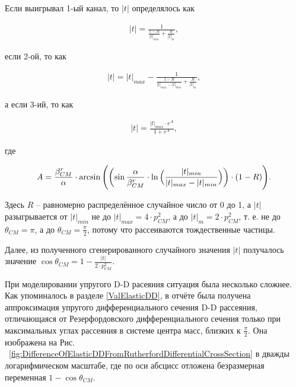 \documentclass[a4paper,12pt]{article}
\begin{document}
\begin{large}
	Если выигрывал 1-ый канал, то $|t|$ определялось как
	
\begin{equation}
\label{Channel1TEqualParticles}
\begin{aligned} 
  |t| = \frac{1}{ \frac{1-R}{|t|_{min}} + \frac{R}{|t|_m} },
\end{aligned}
\end{equation}

	если 2-ой, то как
	
\begin{equation}
\label{Channel2TEqualParticles}
\begin{aligned} 
  |t| = |t|_{max} - \frac{1}{ \frac{1-R}{|t|_{max}-|t|_{min}} + \frac{R}{|t|_m} },
\end{aligned}
\end{equation}

	а если 3-ий, то как
	
\begin{equation}
\label{Channel3TEqualParticles}
\begin{aligned} 
  |t| = \frac{ |t|_{max} \cdot e^A}{1+e^A},
\end{aligned}
\end{equation}

	где
	
\begin{equation}
\label{Channel3TEqualParticlesA}
\begin{aligned} 
  A = \frac{ \beta^r_{CM} }{\alpha} \cdot \arcsin{ \Biggl( \biggl( \sin{ \frac{\alpha}{\beta^r_{CM}} \cdot \ln{ \Bigl( \frac{|t|_{min}}{|t|_{max}-|t|_{min}} \Bigr) } \biggr) } \cdot \left( 1-R \right) \Biggr) }.
\end{aligned}
\end{equation}

	Здесь $R$ -- равномерно распределённое случайное число от 0 до 1, а $|t|$ разыгрывается от $|t|_{min}$ не до $|t|_{max}=4\cdot p^2_{CM}$, а до $|t|_m=2\cdot p^2_{CM}$, т. е. не до $\theta_{CM}=\pi$, а до $\theta_{CM}=\frac{\pi}{2}$, потому что рассеиваются тождественные частицы.
	
	Далее, из полученного сгенерированного случайного значения $|t|$ получалось значение $\cos{ \theta_{CM} }=1-\frac{|t|}{2\cdot p^2_{CM}}$.
	
	При моделировании упругого D-D расеяния ситуация была несколько сложнее.
	Как упоминалось в разделе \ref{ValElasticDD}, в отчёте \cite{70/778-T} была получена аппроксимация упругого дифференциального сечения D-D рассеяния, отличающаяся от Резерфордовского дифференциального сечения только при максимальных углах рассеяния в системе центра масс, близких к $\frac{\pi}{2}$.
	Она изображена на Рис. ~\ref{fig:DifferenceOfElasticDDFromRutherfordDifferentialCrossSection} в дважды логарифмическом масштабе, где по оси абсцисс отложена безразмерная переменная $1-\cos{ \theta_{CM}}$.
	

\end{large}
\end{document}
